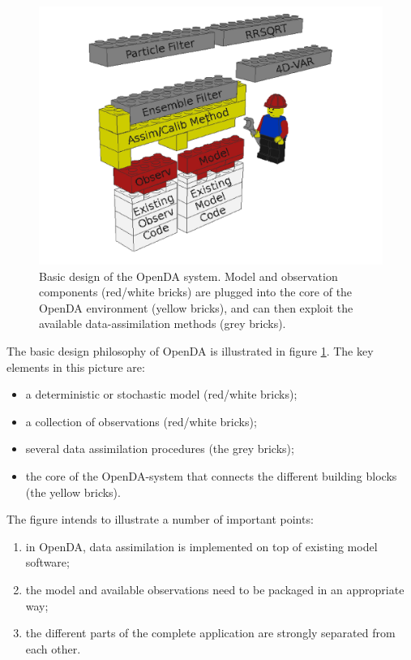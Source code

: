 \begin{figure}[H]
\center
\includegraphics[width=1.0\textwidth]{getting_started/figures/legocomponents2.png}
\caption{Basic design of the OpenDA system. Model and observation components (red/white bricks) are plugged into the core of the OpenDA environment (yellow bricks), and can then exploit the available data-assimilation methods (grey bricks).}
\label{fig:legoblocks}
\end{figure}

The basic design philosophy of OpenDA is illustrated in figure \ref{fig:legoblocks}. The key elements in this picture are:

\begin{itemize}
\item a deterministic or stochastic model (red/white bricks);
\item a collection of observations (red/white bricks);
\item several data assimilation procedures (the grey bricks);
\item the core of the OpenDA-system that connects the different building blocks (the yellow bricks).
\end{itemize}

The figure intends to illustrate a number of important points:

\begin{enumerate}
\item in OpenDA, data assimilation is implemented on top of existing model software;
\item the model and available observations need to be packaged in an appropriate way;
\item the different parts of the complete application are strongly separated from each other.
\end{enumerate}
    

